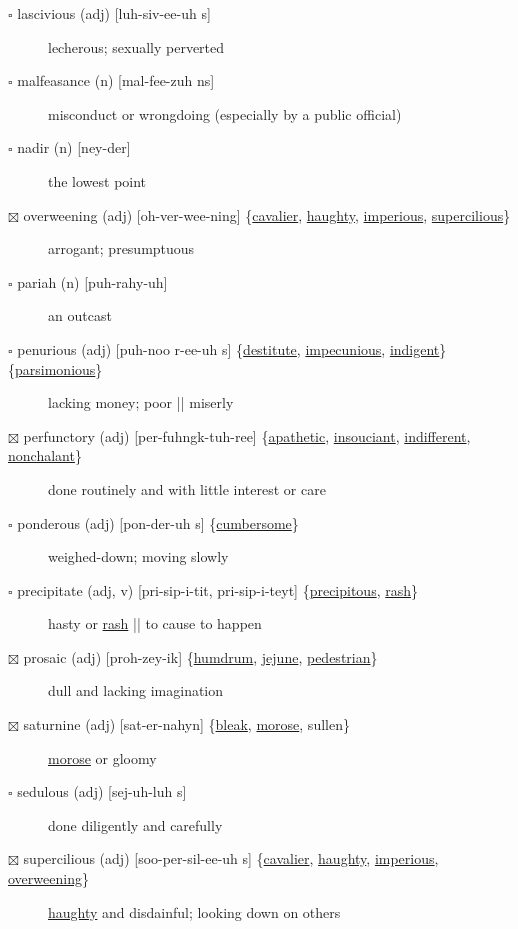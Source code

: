 \documentclass[11pt]{article}
\begin{document}
\begin{description}
\item[{$\square$ lascivious (adj) [luh-siv-ee-uh s]}] lecherous; sexually perverted
\item[{$\square$ malfeasance (n) [mal-fee-zuh ns]}] misconduct or wrongdoing (especially by a public official)
\item[{$\square$ nadir (n) [ney-der]}] the lowest point
\item[{$\boxtimes$ \label{orgd0e4f1a}overweening (adj) [oh-ver-wee-ning] \{\hyperref[org3d40184]{cavalier}, \hyperref[org7951d4f]{haughty}, \hyperref[org21b1cf6]{imperious}, \hyperref[org457da96]{supercilious}\}}] arrogant; presumptuous
\item[{$\square$ pariah (n) [puh-rahy-uh]}] an outcast
\item[{$\square$ \label{orgb268dd4}penurious (adj) [puh-noo r-ee-uh s] \{\hyperref[orgecdf9e1]{destitute}, \hyperref[org6910be9]{impecunious}, \hyperref[org975d945]{indigent}\} \{\hyperref[org6ab672d]{parsimonious}\}}] lacking money; poor || miserly
\item[{$\boxtimes$ \label{org8561795}perfunctory (adj) [per-fuhngk-tuh-ree] \{\hyperref[org934ecd1]{apathetic}, \hyperref[org2634905]{insouciant}, \hyperref[org1f21a65]{indifferent}, \hyperref[orge75040c]{nonchalant}\}}] done routinely and with little interest or care
\item[{$\square$ \label{orgbbf759e}ponderous (adj) [pon-der-uh s] \{\hyperref[orgbef640f]{cumbersome}\}}] weighed-down; moving slowly
\item[{$\square$ \label{orgb014b69}precipitate (adj, v) [pri-sip-i-tit, pri-sip-i-teyt] \{\hyperref[orgf789f07]{precipitous}, \hyperref[orgdaf3ff6]{rash}\}}] hasty or \hyperref[orgdaf3ff6]{rash} || to cause to happen
\item[{$\boxtimes$ \label{orgb8ddd33}prosaic (adj) [proh-zey-ik] \{\hyperref[org896fd35]{humdrum}, \hyperref[org2d80182]{jejune}, \hyperref[org78dd6a1]{pedestrian}\}}] dull and lacking imagination
\item[{$\boxtimes$ \label{orgb873785}saturnine (adj) [sat-er-nahyn] \{\hyperref[org37831d4]{bleak}, \hyperref[orge33fcaf]{morose}, sullen\}}] \hyperref[orge33fcaf]{morose} or gloomy
\item[{$\square$ sedulous (adj) [sej-uh-luh s]}] done diligently and carefully
\item[{$\boxtimes$ \label{org457da96}supercilious (adj) [soo-per-sil-ee-uh s] \{\hyperref[org3d40184]{cavalier}, \hyperref[org7951d4f]{haughty}, \hyperref[org21b1cf6]{imperious}, \hyperref[orgd0e4f1a]{overweening}\}}] \hyperref[org7951d4f]{haughty} and disdainful; looking down on others

\end{description}
\end{document}
